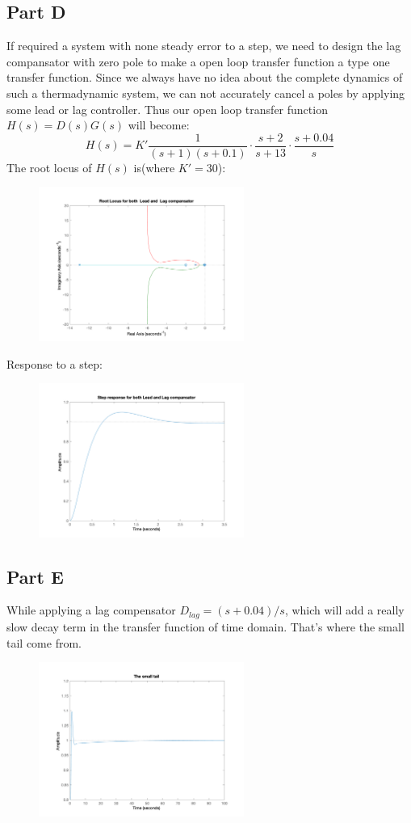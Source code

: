 \documentclass[a4paper]{article}
\begin{document}
\subsection{Part D} 
If required a system with none steady error to a step, we need to design the lag compansator with zero pole to make a open loop transfer function a type one transfer function. Since we always have no idea about the complete dynamics of such a thermadynamic system, we can not accurately cancel a poles by applying some lead or lag controller. Thus our open loop transfer function $H(s) = D(s)G(s)$ will become:
$$
H(s) = K'\frac{1}{(s+1)(s+0.1)}\cdot\frac{s+2}{s+13}\cdot\frac{s+0.04}{s}
$$
The root locus of $H(s)$ is(where $K' = 30$):
\begin{figure}[H]
\centering
\includegraphics[width = 0.6\textwidth]{pic/t4.png}
\end{figure}
Response to a step:
\begin{figure}[H]
\centering
\includegraphics[width = 0.6\textwidth]{pic/t5.png}
\end{figure}

\subsection{Part E} 
While applying a lag compensator $D_{lag} = (s+0.04)/s$, which will add a really slow decay term in the transfer function of time domain. That's where the small tail come from.  

\begin{figure}[H]
\centering
\includegraphics[width = 0.6\textwidth]{pic/t6.png}
\end{figure}


\end{document}

